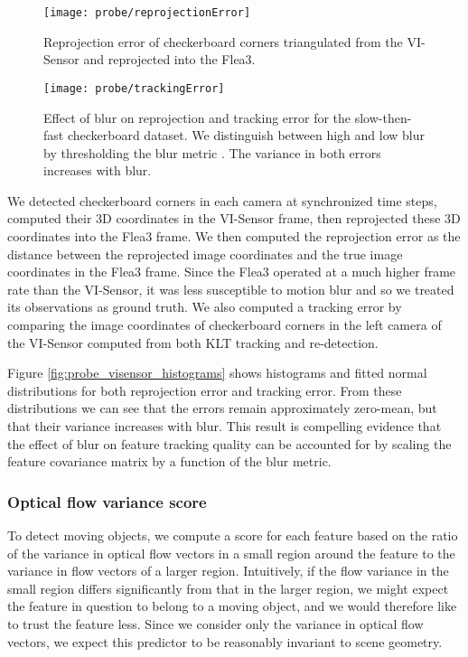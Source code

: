 \begin{figure}
    \centering
        \texttt{[image: probe/reprojectionError]}
        \label{fig:probe_visensor_reprojectionError}
      \caption{Reprojection error of checkerboard corners triangulated from the VI-Sensor and reprojected into the Flea3.}
\end{figure}

\begin{figure}
    \centering
    \texttt{[image: probe/trackingError]}
    \label{fig:probe_visensor_trackingError}
    \caption{Effect of blur on reprojection and tracking error for the slow-then-fast checkerboard dataset. We distinguish between high and low blur by thresholding the blur metric \cite{Anonymous:Ngi3VEEU}. The variance in both errors increases with blur.}
    \label{fig:visensor_histograms}
\end{figure}

We detected checkerboard corners in each camera at synchronized time steps, computed their 3D coordinates in the VI-Sensor frame, then reprojected these 3D coordinates into the Flea3 frame.
We then computed the reprojection error as the distance between the reprojected image coordinates and the true image coordinates in the Flea3 frame.
Since the Flea3 operated at a much higher frame rate than the VI-Sensor, it was less susceptible to motion blur and so we treated its observations as ground truth.
We also computed a tracking error by comparing the image coordinates of checkerboard corners in the left camera of the VI-Sensor computed from both KLT tracking \cite{Lucas:1981uw} and re-detection.

Figure \ref{fig:probe_visensor_histograms} shows histograms and fitted normal distributions for both reprojection error and tracking error.
From these distributions we can see that the errors remain approximately zero-mean, but that their variance increases with blur.
This result is compelling evidence that the effect of blur on feature tracking quality can be accounted for by scaling the feature covariance matrix by a function of the blur metric.


\subsubsection{Optical flow variance score}
To detect moving objects, we compute a score for each feature based on the ratio of the variance in optical flow vectors in a small region around the feature to the variance in flow vectors of a larger region.
Intuitively, if the flow variance in the small region differs significantly from that in the larger region, we might expect the feature in question to belong to a moving object, and we would therefore like to trust the feature less.
Since we consider only the variance in optical flow vectors, we expect this predictor to be reasonably invariant to scene geometry.

